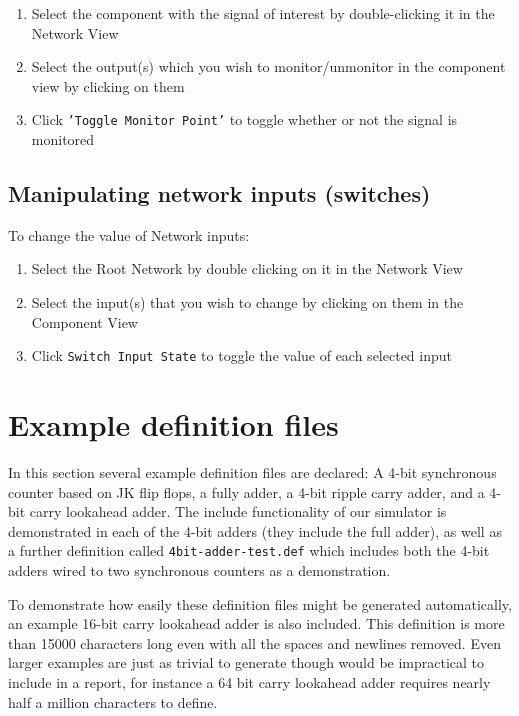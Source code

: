 \documentclass[a4paper]{article}
\begin{document}
        \begin{enumerate}
            \item Select the component with the signal of interest by double-clicking it in the Network View
            \item Select the output(s) which you wish to monitor/unmonitor in the component view by clicking on them
            \item Click \texttt{'Toggle Monitor Point'} to toggle whether or not the signal is monitored
        \end{enumerate}

    \subsection{Manipulating network inputs (switches)}

        To change the value of Network inputs:
        \begin{enumerate}
            \item Select the Root Network by double clicking on it in the Network View
            \item Select the input(s) that you wish to change by clicking on them in the Component View
            \item Click \texttt{Switch Input State} to toggle the value of each selected input
        \end{enumerate}



\clearpage

\section{Example definition files}
    In this section several example definition files are declared: A 4-bit synchronous counter based on JK flip flops, a fully adder, a 4-bit ripple carry adder, and a 4-bit carry lookahead adder.
    The include functionality of our simulator is demonstrated in each of the 4-bit adders (they include the full adder), as well as a further definition called \texttt{4bit-adder-test.def} which includes both the 4-bit adders wired to two synchronous counters as a demonstration.

    To demonstrate how easily these definition files might be generated automatically, an example 16-bit carry lookahead adder is also included. This definition is more than 15000 characters long even with all the spaces and newlines removed. Even larger examples are just as trivial to generate though would be impractical to include in a report, for instance a 64 bit carry lookahead adder requires nearly half a million characters to define.
\end{document}
